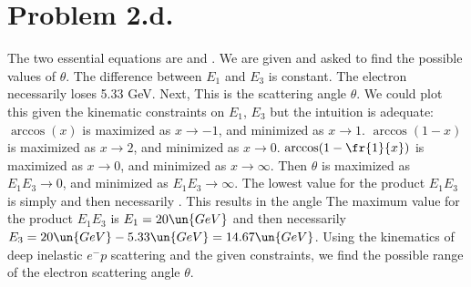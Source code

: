 \documentclass{article}
\begin{document}
\section*{Problem 2.d.}
The two essential equations are  and . We are given
and asked to find the possible values of $\theta$.
The difference between $E_1$ and $E_3$ is constant. The electron necessarily loses 5.33 GeV. Next,
This is the scattering angle $\theta$. We could plot this given the kinematic constraints on $E_1$, $E_3$ but the intuition is adequate: $\arccos(x)$ is maximized as $x\rightarrow -1$, and minimized as $x\rightarrow 1$. $\arccos(1-x)$ is maximized as $x\rightarrow 2$, and minimized as $x\rightarrow 0$. $\arccos(1-\fr{1}{x})$ is maximized as $x\rightarrow0$, and minimized as $x\rightarrow \infty$. Then $\theta$ is maximized as $E_1E_3 \rightarrow 0$, and minimized as $E_1E_3\rightarrow \infty$. The lowest value for the product $E_1E_3$ is simply  and then necessarily . This results in the angle
The maximum value for the product $E_1E_3$ is $E_1=20\un{GeV}$ and then necessarily $E_3=20\un{GeV}-5.33\un{GeV}=14.67\un{GeV}$.
Using the kinematics of deep inelastic $e^{-}p$ scattering and the given constraints, we find the possible range of the electron scattering angle $\theta$.
\end{document}
